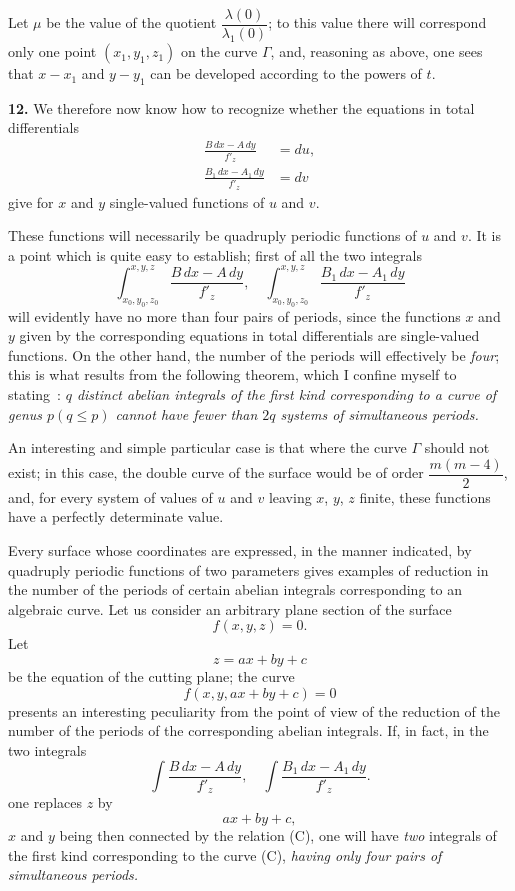 \documentclass{article}
\begin{document}
Let $\mu$ be the value of the quotient $\dfrac{\lambda(0)}{\lambda_{1}(0)}$; to this value there will correspond
only one point $(x_{1}, y_{1}, z_{1})$ on the curve $\Gamma$, and, reasoning as above, one sees that $x - x_{1}$ and $y - y_{1}$ can be developed according to the powers of $t$.

\textbf{12.} We therefore now know how to recognize whether the equations in total differentials
\[
\begin{aligned}
\frac{B\,dx - A\,dy}{f'_{z}} &= du, \\
\frac{B_{1}\,dx - A_{1}\,dy}{f'_{z}} &= dv
\end{aligned}
\]
give for $x$ and $y$ single-valued functions of $u$ and $v$.

These functions will necessarily be quadruply periodic functions of $u$ and $v$. It is a point which is quite easy to establish; first of all the two integrals
\[
\int_{x_{0}, y_{0}, z_{0}}^{x, y, z} \frac{B\,dx - A\,dy}{f'_{z}}, \quad \int_{x_{0}, y_{0}, z_{0}}^{x, y, z} \frac{B_{1}\,dx - A_{1}\,dy}{f'_{z}}
\]
will evidently have no more than four pairs of periods, since the functions $x$ and $y$ given by the corresponding equations in total differentials are single-valued functions. On the other hand, the number of the periods will effectively be \emph{four}; this is what results from the following theorem, which I confine myself to stating~: \emph{$q$ distinct abelian integrals of the first kind corresponding to a curve of genus $p (q \leq p)$ cannot have fewer than $2q$ systems of simultaneous periods.}

An interesting and simple particular case is that where the curve $\Gamma$ should not exist; in this case, the double curve of the surface would be of order $\dfrac{m(m - 4)}{2}$, and, for every system of values of $u$ and $v$ leaving $x$, $y$, $z$ finite, these functions have a perfectly determinate value.

Every surface whose coordinates are expressed, in the manner indicated, by quadruply periodic functions of two parameters gives examples of reduction in the number of the periods of certain abelian integrals corresponding to an algebraic curve. Let us consider an arbitrary plane section of the surface
\[
f(x, y, z) = 0.
\]
Let
\[
z = ax + by + c
\]
be the equation of the cutting plane; the curve
\[
f(x, y, ax + by + c) = 0 \tag{C}
\]
presents an interesting peculiarity from the point of view of the reduction of the number of the periods of the corresponding abelian integrals. If, in fact, in the two integrals
\[
\int \frac{B\,dx - A\,dy}{f'_{z}}, \quad \int \frac{B_{1}\,dx - A_{1}\,dy}{f'_{z}}.
\]
one replaces $z$ by
\[
ax + by + c,
\]
$x$ and $y$ being then connected by the relation (C), one will have \emph{two} integrals of the first kind corresponding to the curve (C), \emph{having only four pairs of simultaneous periods.}
\end{document}
